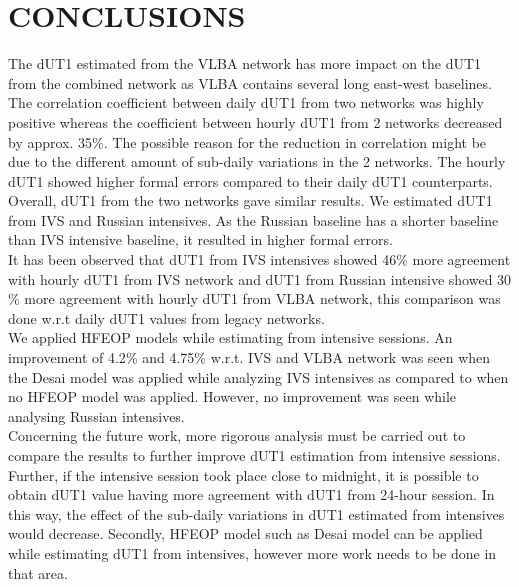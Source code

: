 \documentclass[smallextended]{svjour3}       %
\begin{document}
\section{CONCLUSIONS}
The dUT1 estimated from the VLBA network has more impact on the dUT1 from the combined network as VLBA contains several long east-west baselines. The correlation coefficient between daily dUT1 from two networks was highly positive whereas the coefficient between hourly dUT1 from 2 networks decreased by approx. 35$\%$. The possible reason for the reduction in correlation might be due to the different amount of sub-daily variations in the 2 networks. The hourly dUT1 showed higher formal errors compared to their daily dUT1 counterparts. Overall, dUT1 from the two networks gave similar results. We estimated dUT1 from IVS and Russian intensives. As the Russian baseline has a shorter baseline than IVS intensive baseline, it resulted in higher formal errors.\\
It has been observed that dUT1 from IVS intensives showed 46$\%$ more agreement with hourly dUT1 from IVS network and dUT1 from Russian intensive showed 30$\%$ more agreement with hourly dUT1 from VLBA network, this comparison was done w.r.t daily dUT1 values from legacy networks.\\
We applied HFEOP models while estimating from intensive sessions. An improvement of 4.2$\%$ and 4.75$\%$ w.r.t. IVS and VLBA network was seen when the Desai model was applied while analyzing IVS intensives as compared to when no HFEOP model was applied. However, no improvement was seen while analysing Russian intensives. \\
Concerning the future work, more rigorous analysis must be carried out to compare the results to further improve dUT1 estimation from intensive sessions. Further, if the intensive session took place close to midnight, it is possible to obtain dUT1 value having more agreement with dUT1 from 24-hour session. In this way, the effect of the sub-daily variations in dUT1 estimated from intensives would decrease. Secondly, HFEOP model such as Desai model can be applied while estimating dUT1 from intensives, however more work needs to be done in that area. 


\end{document}
